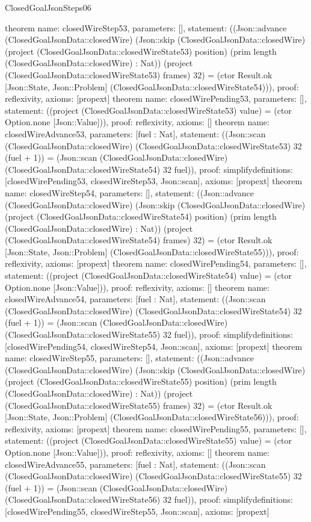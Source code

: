 \begin{lexlean}{ClosedGoalJsonSteps06}
\begin{semanticmodule}
{}
theorem{
 name: closedWireStep53, parameters: [],
 statement: ((Json::advance (ClosedGoalJsonData::closedWire) (Json::skip (ClosedGoalJsonData::closedWire) (project (ClosedGoalJsonData::closedWireState53) position) (prim length (ClosedGoalJsonData::closedWire) : Nat)) (project (ClosedGoalJsonData::closedWireState53) frames) 32) = (ctor Result.ok [Json::State, Json::Problem] (ClosedGoalJsonData::closedWireState54))), proof: reflexivity{}, axioms: [propext]
}
theorem{
 name: closedWirePending53, parameters: [],
 statement: ((project (ClosedGoalJsonData::closedWireState53) value) = (ctor Option.none [Json::Value])), proof: reflexivity{}, axioms: []
}
theorem{
 name: closedWireAdvance53, parameters: [fuel : Nat],
 statement: ((Json::scan (ClosedGoalJsonData::closedWire) (ClosedGoalJsonData::closedWireState53) 32 (fuel + 1)) = (Json::scan (ClosedGoalJsonData::closedWire) (ClosedGoalJsonData::closedWireState54) 32 fuel)), proof: simplify{definitions: [closedWirePending53, closedWireStep53, Json::scan]}, axioms: [propext]
}
theorem{
 name: closedWireStep54, parameters: [],
 statement: ((Json::advance (ClosedGoalJsonData::closedWire) (Json::skip (ClosedGoalJsonData::closedWire) (project (ClosedGoalJsonData::closedWireState54) position) (prim length (ClosedGoalJsonData::closedWire) : Nat)) (project (ClosedGoalJsonData::closedWireState54) frames) 32) = (ctor Result.ok [Json::State, Json::Problem] (ClosedGoalJsonData::closedWireState55))), proof: reflexivity{}, axioms: [propext]
}
theorem{
 name: closedWirePending54, parameters: [],
 statement: ((project (ClosedGoalJsonData::closedWireState54) value) = (ctor Option.none [Json::Value])), proof: reflexivity{}, axioms: []
}
theorem{
 name: closedWireAdvance54, parameters: [fuel : Nat],
 statement: ((Json::scan (ClosedGoalJsonData::closedWire) (ClosedGoalJsonData::closedWireState54) 32 (fuel + 1)) = (Json::scan (ClosedGoalJsonData::closedWire) (ClosedGoalJsonData::closedWireState55) 32 fuel)), proof: simplify{definitions: [closedWirePending54, closedWireStep54, Json::scan]}, axioms: [propext]
}
theorem{
 name: closedWireStep55, parameters: [],
 statement: ((Json::advance (ClosedGoalJsonData::closedWire) (Json::skip (ClosedGoalJsonData::closedWire) (project (ClosedGoalJsonData::closedWireState55) position) (prim length (ClosedGoalJsonData::closedWire) : Nat)) (project (ClosedGoalJsonData::closedWireState55) frames) 32) = (ctor Result.ok [Json::State, Json::Problem] (ClosedGoalJsonData::closedWireState56))), proof: reflexivity{}, axioms: [propext]
}
theorem{
 name: closedWirePending55, parameters: [],
 statement: ((project (ClosedGoalJsonData::closedWireState55) value) = (ctor Option.none [Json::Value])), proof: reflexivity{}, axioms: []
}
theorem{
 name: closedWireAdvance55, parameters: [fuel : Nat],
 statement: ((Json::scan (ClosedGoalJsonData::closedWire) (ClosedGoalJsonData::closedWireState55) 32 (fuel + 1)) = (Json::scan (ClosedGoalJsonData::closedWire) (ClosedGoalJsonData::closedWireState56) 32 fuel)), proof: simplify{definitions: [closedWirePending55, closedWireStep55, Json::scan]}, axioms: [propext]
}
\end{semanticmodule}
\end{lexlean}
